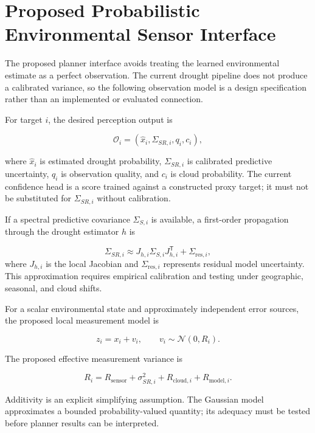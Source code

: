 \documentclass[11pt,a4paper]{article}
\begin{document}
\section{Proposed Probabilistic Environmental Sensor Interface}

The proposed planner interface avoids treating the learned
environmental estimate as a perfect observation. The current drought
pipeline does not produce a calibrated variance, so the following
observation model is a design specification rather than an implemented
or evaluated connection.

For target $i$, the desired perception output is

\begin{equation}
\mathcal O_i
=
\left(
\hat{x}_i,
\Sigma_{SR,i},
q_i,
c_i
\right),
\end{equation}

where $\hat{x}_i$ is estimated drought probability,
$\Sigma_{SR,i}$ is calibrated predictive uncertainty, $q_i$ is
observation quality, and $c_i$ is cloud probability. The current
confidence head is a score trained against a constructed proxy target;
it must not be substituted for $\Sigma_{SR,i}$ without calibration.

If a spectral predictive covariance $\Sigma_{S,i}$ is available, a
first-order propagation through the drought estimator $h$ is

\begin{equation}
\Sigma_{SR,i}
\approx
J_{h,i}\Sigma_{S,i}J_{h,i}^{\mathsf T}
+\Sigma_{\mathrm{res},i},
\end{equation}
where $J_{h,i}$ is the local Jacobian and
$\Sigma_{\mathrm{res},i}$ represents residual model uncertainty. This
approximation requires empirical calibration and testing under
geographic, seasonal, and cloud shifts.

For a scalar environmental state and approximately independent error
sources, the proposed local measurement model is

\begin{equation}
z_i=x_i+v_i,\qquad v_i\sim\mathcal N(0,R_i).
\end{equation}

The proposed effective measurement variance is

\begin{equation}
\boxed{
R_i
=
R_{\mathrm{sensor}}
+ \sigma^2_{SR,i}
+
R_{\mathrm{cloud},i}
+ R_{\mathrm{model},i}.
}
\end{equation}

Additivity is an explicit simplifying assumption. The Gaussian model
approximates a bounded probability-valued quantity; its adequacy must
be tested before planner results can be interpreted.
\end{document}
